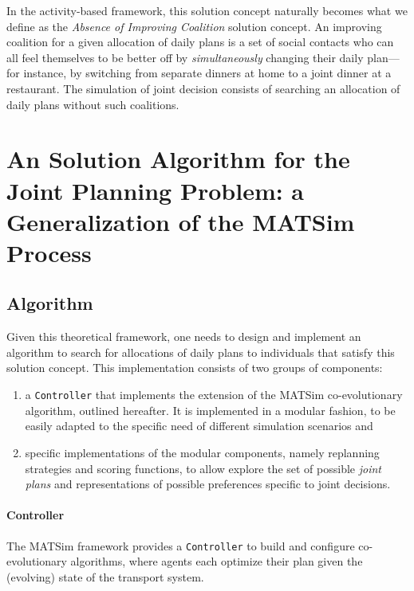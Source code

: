 {In the activity-based framework, this solution concept naturally becomes what we define as the \emph{Absence of Improving Coalition} solution concept. An improving coalition for a given allocation of daily plans is a set of social contacts who can all feel themselves to be better off by \emph{simultaneously} changing their daily plan---for instance, by switching from separate dinners at home to a joint dinner at a restaurant.
The simulation of joint decision consists of searching an allocation of daily plans without such coalitions.

\section{An Solution Algorithm for the Joint Planning Problem: a Generalization of the MATSim Process}
\label{sec:td:algo}
\subsection{Algorithm}
Given this theoretical framework, one needs to design and implement an algorithm to search for allocations of daily plans to individuals that satisfy this solution concept. This implementation consists of two groups of components:
%
\begin{enumerate}
\item a \lstinline|Controller| that implements the extension of the MATSim co-evolutionary algorithm, outlined hereafter. It is implemented in a modular fashion, to be easily adapted to the specific need of different simulation scenarios and
\item specific implementations of the modular components, namely replanning strategies and scoring functions, to allow explore the set of possible \emph{joint plans} and representations of possible preferences specific to joint decisions.
\end{enumerate}

\paragraph{Controller}

The MATSim framework provides a \lstinline|Controller| to build and configure co-evolutionary algorithms, where agents each optimize their plan given the (evolving) state of the transport system.

}
